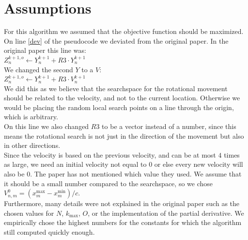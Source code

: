 \documentclass[runningheads]{llncs}
\begin{document}
\newpage
\section{Assumptions}
For this algorithm we assumed that the objective function should be maximized.\\
On line \ref{dev} of the pseudocode we deviated from the original paper. In the original paper this line was: \\
$Z_n^{k+1, o} \leftarrow Y_n^{k+1} + R3 \cdot Y_n^{k+1}$ \\\label{assumption}
We changed the second $ Y $ to a $V$:\\
$Z_n^{k+1, o} \leftarrow Y_n^{k+1} + R3 \cdot V_n^{k+1}$ \\
We did this as we believe that the searchspace for the rotational movement should be related to the velocity, and not to the current location. Otherwise we would be placing the random local search points on a line through the origin, which is arbitrary. \\
On this line we also changed $R3$ to be a vector instead of a number, since this means the rotational search is not just in the direction of the movement but also in other directions. \\
Since the velocity is based on the previous velocity, and can be at most $4$ times as large, we need an initial velocity not equal to $0$ or else every new velocity will also be $0$. The paper has not mentioned which value they used. We assume that it should be a small number compared to the searchspace, so we chose $V_{n,m}^0 = (x_m^{\text{max}} - x_m^{\text{min}})/c$.\\
Furthermore, many details were not explained in the original paper such as the chosen values for $N$, $k_{\text{max}}$, $O$, or the implementation of the partial derivative. We empirically chose the highest numbers for the constants for which the algorithm still computed quickly enough.\\
\end{document}
